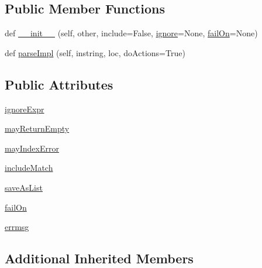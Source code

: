 \subsection*{Public Member Functions}
\begin{DoxyCompactItemize}
\item 
def \hyperlink{classpyparsing_1_1SkipTo_a2b9335c3694c26bf610e029a47455f13}{\+\_\+\+\_\+init\+\_\+\+\_\+} (self, other, include=False, \hyperlink{classpyparsing_1_1ParseElementEnhance_a905d181fa723dd7f828d423362ba040c}{ignore}=None, \hyperlink{classpyparsing_1_1SkipTo_a548f926356d8b839cde70e7fa1a14cd5}{fail\+On}=None)
\item 
def \hyperlink{classpyparsing_1_1SkipTo_affb6cec655458cb1406ab9ae384dda5d}{parse\+Impl} (self, instring, loc, do\+Actions=True)
\end{DoxyCompactItemize}
\subsection*{Public Attributes}
\begin{DoxyCompactItemize}
\item 
\hyperlink{classpyparsing_1_1SkipTo_a4247e97e3cf6ebe46a24948c01739c34}{ignore\+Expr}
\item 
\hyperlink{classpyparsing_1_1SkipTo_aea4cbf8d96b8bbec6d6fc4f648cca24c}{may\+Return\+Empty}
\item 
\hyperlink{classpyparsing_1_1SkipTo_aa38b70dfd8de84b7632a39fcd114ba05}{may\+Index\+Error}
\item 
\hyperlink{classpyparsing_1_1SkipTo_a723c5d4e54061e189bb14ae32b261a1a}{include\+Match}
\item 
\hyperlink{classpyparsing_1_1SkipTo_a6bab6f9b7ddb9a8f737d0757b381def8}{save\+As\+List}
\item 
\hyperlink{classpyparsing_1_1SkipTo_a548f926356d8b839cde70e7fa1a14cd5}{fail\+On}
\item 
\hyperlink{classpyparsing_1_1SkipTo_a2763971e4ce1e994a80ac878f50b5463}{errmsg}
\end{DoxyCompactItemize}
\subsection*{Additional Inherited Members}


